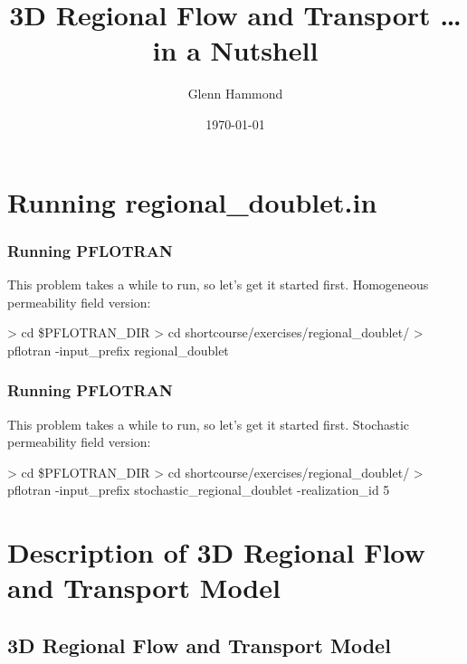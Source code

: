 \documentclass{beamer}
\begin{document}
\title{3D Regional Flow and Transport \ldots in a Nutshell}
\author{Glenn Hammond}
\date{\today}


\section{Running regional_doublet.in}

\begin{frame}[fragile]\frametitle{Running PFLOTRAN}

This problem takes a while to run, so let's get it started first.
Homogeneous permeability field version:

\begin{semiverbatim}

 > cd \$PFLOTRAN_DIR
 > cd shortcourse/exercises/regional_doublet/
 > pflotran -input_prefix regional_doublet

\end{semiverbatim}

\end{frame}

\begin{frame}[fragile]\frametitle{Running PFLOTRAN}

This problem takes a while to run, so let's get it started first.
Stochastic permeability field version:

\begin{semiverbatim}
 > cd \$PFLOTRAN_DIR
 > cd shortcourse/exercises/regional_doublet/
 > pflotran -input_prefix stochastic_regional_doublet
  -realization_id 5
\end{semiverbatim}

\end{frame}

\section{Description of 3D Regional Flow and Transport Model}

\subsection{3D Regional Flow and Transport Model}
\end{document}
